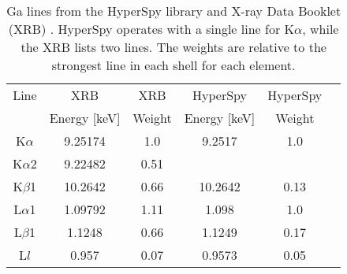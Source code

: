 
\begin{table}[tbp]
    \centering
    \caption{
        Ga lines from the HyperSpy library \cite{hyperspy_1.7.1} and X-ray Data Booklet (XRB) \cite[Table 1.2 and 1.3]{thompson_x-ray_2004}.
        HyperSpy operates with a single line for K$\alpha$, while the XRB lists two lines.
        The weights are relative to the strongest line in each shell for each element.
    }
    \label{tab:theory:Ga-lines}
    \begin{tabular}{cccccc}
        Line        & XRB          & XRB    & HyperSpy     & HyperSpy \\
                    & Energy [keV] & Weight & Energy [keV] & Weight   \\
        \hline
        K$ \alpha$  & 9.25174      & 1.0    & 9.2517       & 1.0      \\
        K$ \alpha$2 & 9.22482      & 0.51   &              &          \\
        K$ \beta$1  & 10.2642      & 0.66   & 10.2642      & 0.13     \\
        L$ \alpha$1 & 1.09792      & 1.11   & 1.098        & 1.0      \\
        L$ \beta$1  & 1.1248       & 0.66   & 1.1249       & 0.17     \\
        L$l$        & 0.957        & 0.07   & 0.9573       & 0.05     %
    \end{tabular}
\end{table}